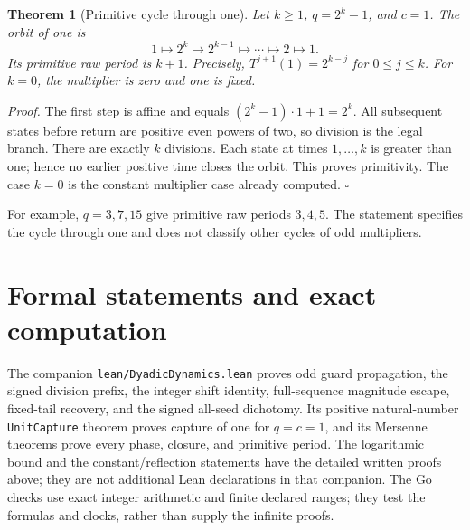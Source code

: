 \documentclass[11pt,letterpaper]{article}
\newtheorem{theorem}{Theorem}
\newenvironment{proof}{\noindent\textit{Proof.}}{\hfill\(\square\)}
\begin{document}
\begin{theorem}[Primitive cycle through one]
\label{thm:mersenne}
Let \(k\ge1\), \(q=2^k-1\), and \(c=1\). The orbit of one is
\[
1\longmapsto2^k\longmapsto2^{k-1}\longmapsto\cdots
\longmapsto2\longmapsto1.
\]
Its primitive raw period is \(k+1\). Precisely,
\(T^{j+1}(1)=2^{k-j}\) for \(0\le j\le k\).
For \(k=0\), the multiplier is zero and one is fixed.
\end{theorem}

\begin{proof}
The first step is affine and equals \((2^k-1)\cdot1+1=2^k\).
All subsequent states before return are positive even powers of two,
so division is the legal branch. There are exactly \(k\) divisions.
Each state at times \(1,\ldots,k\) is greater than one; hence no earlier
positive time closes the orbit. This proves primitivity. The case
\(k=0\) is the constant multiplier case already computed.
\end{proof}

For example, \(q=3,7,15\) give primitive raw periods \(3,4,5\).
The statement specifies the cycle through one and does not classify
other cycles of odd multipliers.

\section{Formal statements and exact computation}

The companion \texttt{lean/DyadicDynamics.lean} \cite{DyadicCode26}
proves odd guard propagation, the signed division prefix, the integer
shift identity, full-sequence magnitude escape, fixed-tail recovery,
and the signed all-seed dichotomy. Its positive natural-number
\texttt{UnitCapture} theorem proves capture of one for \(q=c=1\),
and its Mersenne theorems prove every phase, closure, and primitive
period. The logarithmic bound and the constant/reflection statements
have the detailed written proofs above; they are not additional Lean
declarations in that companion.
The Go checks use exact integer arithmetic and finite declared ranges;
they test the formulas and clocks, rather than supply the infinite proofs.



\end{document}
